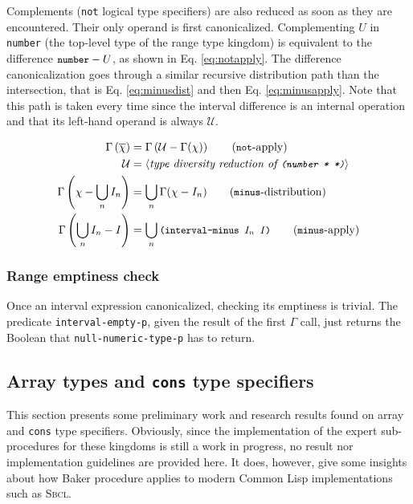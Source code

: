 \documentclass[format=sigconf]{acmart}
\newcommand\code[2][\small]{\sloppy\texttt{#1#2}}
\newcommand\mcode[2][\small]{\text{\code[#1]{#2}}}
\theoremstyle{definition}
\newcommand\sbcl{\textsc{Sbcl}}
\begin{document}
Complements (\code{not} logical type specifiers) are also reduced as soon as
they are encountered. Their only operand is first canonicalized. Complementing
$U$ in \code{number} (the top-level type of the range type kingdom) is
equivalent to the difference $\mcode{number} - U$, as shown in Eq.
\ref{eq:notapply}. The difference canonicalization goes through a similar
recursive distribution path than the intersection, that is Eq.
\ref{eq:minusdist} and then Eq. \ref{eq:minusapply}. Note that this path is
taken every time since the interval difference is an internal operation and that
its left-hand operand is always $\mathcal{U}$.

\begin{align}
  \Gamma\left(\overline{\chi}\right) &= \Gamma\left(\mathcal{U} - \Gamma(\chi)\right) \label{eq:notapply}\tag{\code{not}-apply}\\
  \mathcal{U} &= \langle\text{\it type diversity reduction of \code{(number * *)}}\rangle \nonumber\\
  \Gamma\left(\chi - \bigcup_n I_n\right) &= \bigcup_n \Gamma(\chi - I_n) \label{eq:minusdist}\tag{\code{minus}-distribution} \\
  \Gamma\left(\bigcup_n I_n - I\right) &= \bigcup_n \mcode{(interval-minus $I_n$ $I$)} \label{eq:minusapply}\tag{\code{minus}-apply}
\end{align}

\subsubsection{Range emptiness check}
Once an interval expression canonicalized, checking its emptiness is trivial.
The predicate \code{interval-empty-p}, given the result of the first $\Gamma$
call, just returns the Boolean that \code{null-numeric-type-p} has to return.


\subsection{Array types and \code[\large]{cons} type specifiers}
\label{sec:expoth}
This section presents some preliminary work and research results found on array
and \code{cons} type specifiers. Obviously, since the implementation of the
expert sub-procedures for these kingdoms is still a work in progress, no result
nor implementation guidelines are provided here. It does, however, give some
insights about how Baker procedure applies to modern Common Lisp implementations
such as \sbcl.
\end{document}
